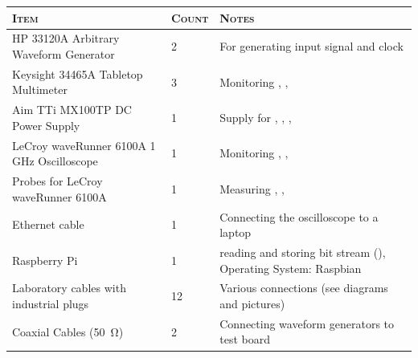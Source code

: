 \begin{centering}
\begin{xtabular}{
    >{\small}p{50mm}
    >{\small}p{8mm}
    >{\small}p{65mm}
}
    \toprule
    \textsc{Item}    &
    \textsc{Count}   &
    \textsc{Notes}   \\
    \midrule

    HP 33120A Arbitrary Waveform Generator  &
    2                                       &
    For generating input signal and clock   \\
 
    Keysight 34465A Tabletop Multimeter                     &
    3                                                       &
    Monitoring , ,  \\

    Aim TTi MX100TP DC Power Supply                                         &
    1                                                                       &
    Supply for , , ,  \\

    
    LeCroy waveRunner 6100A 1 GHz Oscilloscope                        &
    1                                                                 &
    Monitoring , ,  \\

    Probes for LeCroy waveRunner 6100A                               &
    1                                                                &
    Measuring , ,  \\

    Ethernet cable                          &
    1                                       &
    Connecting the oscilloscope to a laptop \\

    Raspberry Pi                                           &
    1                                                      &
    reading and storing bit stream (), 
    Operating System: Raspbian                             \\

    Laboratory cables with industrial plugs         &
    12                                              &
    Various connections (see diagrams and pictures) \\

    Coaxial Cables (\SI{50}{\ohm})               &
    2                                            &
    Connecting waveform generators to test board \\


\end{xtabular}
\end{centering}
